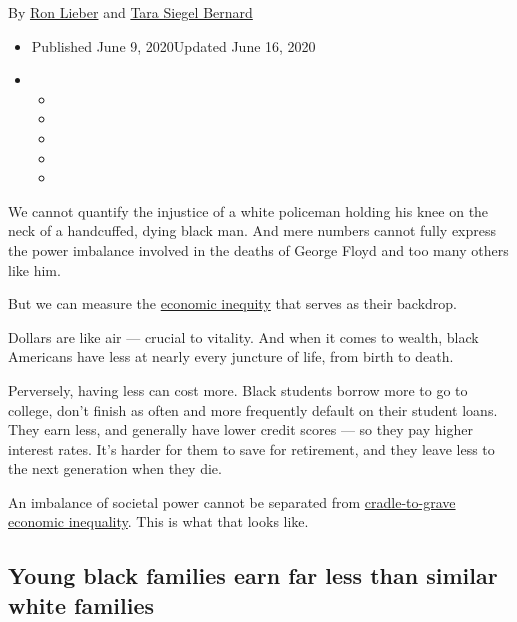 By \href{https://www.nytimes.com/by/ron-lieber}{Ron Lieber} and
\href{https://www.nytimes.com/by/tara-siegel-bernard}{Tara Siegel
Bernard}

\begin{itemize}
\item
  Published June 9, 2020Updated June 16, 2020
\item
  \begin{itemize}
  \item
  \item
  \item
  \item
  \item
  \end{itemize}
\end{itemize}

We cannot quantify the injustice of a white policeman holding his knee
on the neck of a handcuffed, dying black man. And mere numbers cannot
fully express the power imbalance involved in the deaths of George Floyd
and too many others like him.

But we can measure the
\href{https://www.nytimes.com/interactive/2020/06/11/multimedia/coronavirus-new-york-inequality.html}{economic
inequity} that serves as their backdrop.

Dollars are like air --- crucial to vitality. And when it comes to
wealth, black Americans have less at nearly every juncture of life, from
birth to death.

Perversely, having less can cost more. Black students borrow more to go
to college, don't finish as often and more frequently default on their
student loans. They earn less, and generally have lower credit scores
--- so they pay higher interest rates. It's harder for them to save for
retirement, and they leave less to the next generation when they die.

An imbalance of societal power cannot be separated from
\href{https://www.nytimes.com/interactive/2018/03/19/upshot/race-class-white-and-black-men.html}{cradle-to-grave
economic inequality}. This is what that looks like.

\hypertarget{young-black-families-earn-far-less-than-similar-white-families}{%
\subsection{Young black families earn far less than similar white
families}\label{young-black-families-earn-far-less-than-similar-white-families}}

